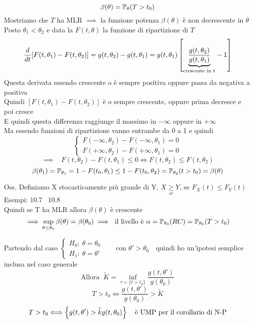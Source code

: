 \begin{Dim}
    \[
    \beta(\theta) = \mathbb P_{\theta} (T>t_0)
    \]
    Mostriamo che $T$ ha MLR $\implies$ la funzione potenza $\beta(\theta)$ è non decrescente in $\theta$\\
    Posto $\theta_1<\theta_2$ e data la $F(t,\theta)$ la funzione di ripartizione di $T$
    \[
    \dfrac{d}{d t}[F(t,\theta_1)- F(t,\theta_2)] = g(t,\theta_2)-g(t,\theta_1) = g(t,\theta_1) \left[ \underset{\text{crescente in t}}{\underbrace{\dfrac{g(t,\theta_2)}{g(t,\theta_1)}}} -1 \right]
    \]
    Questa derivata essendo crescente o è sempre positiva oppure passa da negativa a positiva\\
    Quindi $[F(t,\theta_1)- F(t,\theta_2)]$ è o sempre crescente, oppure prima decresce e poi cresce\\
    E quindi questa differenza raggiunge il massimo in $-\infty$ oppure in $+\infty$\\

    Ma essendo funzioni di ripartizione vanno entrambe da 0 a 1 e quindi
    \[
    \begin{cases}
        F(-\infty,\theta_2)-F(-\infty,\theta_1)=0\\
        F(+\infty,\theta_2)-F(+\infty,\theta_1)=0
    \end{cases}
    \]
    \[
    \implies \ \ \ \ F(t,\theta_2)-F(t,\theta_1)\le 0  \Longleftrightarrow F(t,\theta_2)\le F(t,\theta_2)
    \]
    \[
    \beta (\theta_1)= \mathbb P_{\theta_1} = 1- F(t_0,\theta_1)\le 1- F(t_0,\theta_2)= \mathbb P_{\theta_2}(t>t_0) = \beta(\theta)
    \]

    \phantom{}
    
    Oss. Definiamo X stocasticamente più grande di Y, $X \underset{st}{\ge} Y$, se $F_X(t)\le F_Y(t)$\\
    Esempi: 10.7 \ 10.8\\
    
    Quindi se T ha MLR allora $\beta(\theta)$ è crescente
    \[
    \implies \sup_{\theta\le\theta_0} \beta(\theta)=\beta(\theta_0) \implies \text{ il livello è } \alpha=\mathbb P_{\theta_0}(RC) = \mathbb P_{\theta_0}(T>t_0)
    \]
    \phantom{}

    Partendo dal caso
    $\begin{cases}
        H_0 : \ \theta=\theta_0\\
        H_1 : \ \theta = \theta' 
    \end{cases}$ \ \ \ con $\theta'>\theta_0$\  \ quindi ho un'ipotesi semplice inclusa nel caso generale
    \[
    \text{Allora } \  \tilde{K}= \inf_{\tau=\{t>t_0\}} \frac{g(t,\theta')}{g(\theta_0)}
    \]
    \[
    T>t_0 \Longleftrightarrow \frac{g(t,\theta')}{g(\theta_0)} >\tilde{K}
    \]
    \[
    T>t_0 \Longleftrightarrow \left\{ g(t,\theta')>\widetilde{k}g(t,\theta_0) \right\} \ \ \text{ è UMP per il corollario di N-P} 
    \]
\end{Dim}


